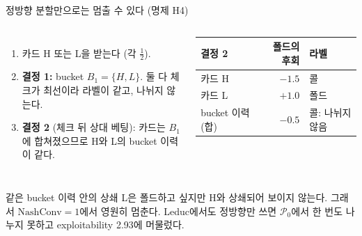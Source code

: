 \documentclass[aspectratio=169,11pt]{beamer}
\newcommand{\Pc}{\mathcal P}
\begin{document}
\begin{frame}{정방향 분할만으로는 멈출 수 있다 (명제 H4)}
\begin{columns}[T,onlytextwidth]
\small
\begin{enumerate}
\item 카드 H 또는 L을 받는다 (각 $\tfrac12$).
\item \textbf{결정 1:} bucket $B_1=\{H,L\}$. 둘 다 체크가 최선이라 라벨이 같고, 나뉘지 않는다.
\item \textbf{결정 2} (체크 뒤 상대 베팅): 카드는 $B_1$에 합쳐졌으므로 H와 L의 bucket 이력이 같다.
\end{enumerate}
\centering\footnotesize\setlength{\tabcolsep}{4pt}
\begin{tabular}{lrl}
\toprule
결정 2 & 폴드의 후회 & 라벨\\
\midrule
카드 H & $-1.5$ & 콜\\
카드 L & $+1.0$ & \textcolor{deeporange}{폴드}\\
\midrule
bucket 이력 (합) & $-0.5$ & 콜: 나뉘지 않음\\
\bottomrule
\end{tabular}
\end{columns}
\vspace{10pt}
\begin{alertblock}{같은 bucket 이력 안의 상쇄}
\small L은 폴드하고 싶지만 H와 상쇄되어 보이지 않는다. 그래서 $\mathrm{NashConv}=1$에서 영원히 멈춘다.
Leduc에서도 정방향만 쓰면 $\Pc_0$에서 한 번도 나누지 못하고 exploitability 2.93에 머물렀다.
\end{alertblock}
\end{frame}
\end{document}

